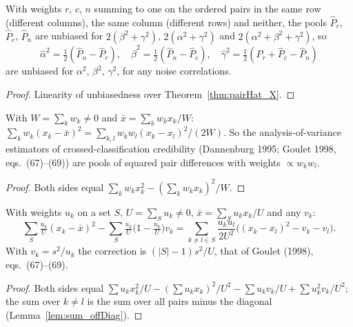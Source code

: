 \begin{theorem}\label{thm:crossed_identified}
  \leanok
  With weights $r$, $c$, $n$ summing to one on the ordered pairs in the same row (different
  columns), the same column (different rows) and neither, the pools $\widehat P_r$, $\widehat P_c$,
  $\widehat P_n$ are unbiased for $2(\beta^2 + \gamma^2)$, $2(\alpha^2 + \gamma^2)$ and
  $2(\alpha^2 + \beta^2 + \gamma^2)$, so
  \[
    \hat\alpha^2 = \tfrac12(\widehat P_n - \widehat P_r), \quad
    \hat\beta^2 = \tfrac12(\widehat P_n - \widehat P_c), \quad
    \hat\gamma^2 = \tfrac12(\widehat P_r + \widehat P_c - \widehat P_n)
  \]
  are unbiased for $\alpha^2$, $\beta^2$, $\gamma^2$, for any noise correlations.
\end{theorem}
\begin{proof}
  \leanok
  Linearity of unbiasedness over Theorem~\ref{thm:pairHat_X}.
\end{proof}

\begin{lemma}\label{lem:sum_sq_pairs}
  \leanok
  With $W = \sum_k w_k \ne 0$ and $\bar x = \sum_k w_kx_k/W$:
  $\sum_k w_k(x_k - \bar x)^2 = \sum_{k,l} w_kw_l(x_k - x_l)^2/(2W)$. So the
  analysis-of-variance estimators of crossed-classification credibility (Dannenburg 1995;
  Goulet 1998, eqs.~(67)--(69)) are pools of squared pair differences with weights $\propto w_kw_l$.
\end{lemma}
\begin{proof}
  \leanok
  Both sides equal $\sum_k w_kx_k^2 - (\sum_k w_kx_k)^2/W$.
\end{proof}

\begin{lemma}\label{lem:sum_sq_noise_pairs}
  \leanok
  With weights $u_k$ on a set $S$, $U = \sum_S u_k \ne 0$, $\bar x = \sum_S u_kx_k/U$ and any $v_k$:
  \[
    \sum_S \tfrac{u_k}{U}(x_k - \bar x)^2 - \sum_S \tfrac{u_k}{U}\bigl(1 - \tfrac{u_k}{U}\bigr)v_k
      = \sum_{k \ne l \in S} \frac{u_ku_l}{2U^2}\bigl((x_k - x_l)^2 - v_k - v_l\bigr).
  \]
  With $v_k = s^2/u_k$ the correction is $(|S| - 1)s^2/U$, that of Goulet (1998), eqs.~(67)--(69).
\end{lemma}
\begin{proof}
  \leanok
  Both sides equal $\sum u_kx_k^2/U - (\sum u_kx_k)^2/U^2 - \sum u_kv_k/U + \sum u_k^2v_k/U^2$;
  the sum over $k \ne l$ is the sum over all pairs minus the diagonal (Lemma~\ref{lem:sum_offDiag}).
\end{proof}

